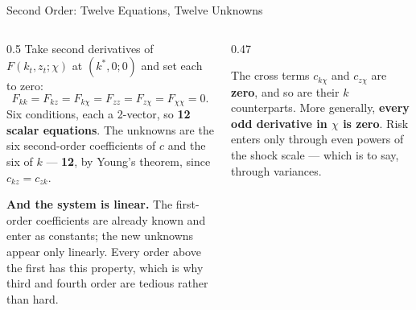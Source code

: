 \begin{frame}{Second Order: Twelve Equations, Twelve Unknowns}
\begin{columns}[T]
\begin{column}{0.5\textwidth}
\small
Take second derivatives of $F(k_t,z_t;\chi)$ at $(k^{*},0;0)$ and set each to zero:
\[
F_{kk}=F_{kz}=F_{k\chi}=F_{zz}=F_{z\chi}=F_{\chi\chi}=0 .
\]
Six conditions, each a 2-vector, so \textbf{12 scalar equations}. The unknowns are the six second-order coefficients of $c$ and the six of $k$ --- \textbf{12}, by Young's theorem, since $c_{kz}=c_{zk}$.
\medskip

\textbf{And the system is linear.} The first-order coefficients are already known and enter as constants; the new unknowns appear only linearly. Every order above the first has this property, which is why third and fourth order are tedious rather than hard.
\end{column}
\begin{column}{0.47\textwidth}
\begin{conceptbox}[title=\textbf{Two things vanish for free}]\small
The cross terms $c_{k\chi}$ and $c_{z\chi}$ are \textbf{zero}, and so are their $k$ counterparts.
\medskip
More generally, \textbf{every odd derivative in $\chi$ is zero}. Risk enters only through even powers of the shock scale --- which is to say, through variances.
\end{conceptbox}
\end{column}
\end{columns}
\vspace{1mm}
\end{frame}

